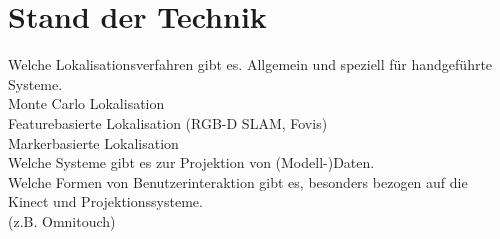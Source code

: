 \chapter{Stand der Technik}
\label{chap:tech}

Welche Lokalisationsverfahren gibt es. Allgemein und speziell für handgeführte Systeme.\\
Monte Carlo Lokalisation\\
Featurebasierte Lokalisation (RGB-D SLAM, Fovis)\\
Markerbasierte Lokalisation\\

Welche Systeme gibt es zur Projektion von (Modell-)Daten.\\


Welche Formen von Benutzerinteraktion gibt es, besonders bezogen auf die Kinect und Projektionssysteme.\\
(z.B. Omnitouch)